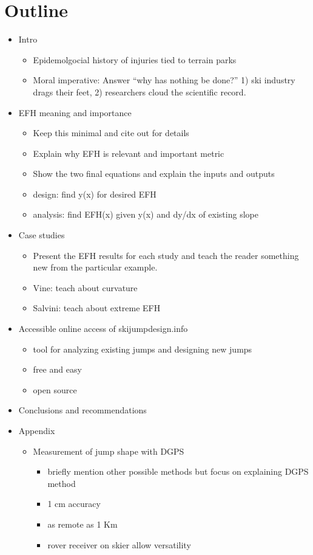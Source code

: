\documentclass{article}
\begin{document}
\section*{Outline}
%
\begin{itemize}
  \item Intro
  \begin{itemize}
    \item Epidemolgocial history of injuries tied to terrain parks
    \item Moral imperative: Answer ``why has nothing be done?'' 1) ski industry
      drags their feet, 2) researchers cloud the scientific record.
  \end{itemize}
  \item EFH meaning and importance
  \begin{itemize}
    \item Keep this minimal and cite out for details
    \item Explain why EFH is relevant and important metric
    \item Show the two final equations and explain the inputs and outputs
    \item design: find y(x) for desired EFH
    \item analysis: find EFH(x) given y(x) and dy/dx of existing slope
  \end{itemize}
  \item Case studies
  \begin{itemize}
    \item Present the EFH results for each study and teach the reader something
      new from the particular example.
    \item Vine: teach about curvature
    \item Salvini: teach about extreme EFH
  \end{itemize}
  \item Accessible online access of skijumpdesign.info
  \begin{itemize}
    \item tool for analyzing existing jumps and designing new jumps
    \item free and easy
    \item open source
  \end{itemize}
  \item Conclusions and recommendations
  \item Appendix
  \begin{itemize}
    \item Measurement of jump shape with DGPS
      \begin{itemize}
        \item briefly mention other possible methods but focus on explaining
          DGPS method
        \item 1 cm accuracy
        \item as remote as 1 Km
        \item rover receiver on skier allow versatility
      \end{itemize}
  \end{itemize}
\end{itemize}
\end{document}
